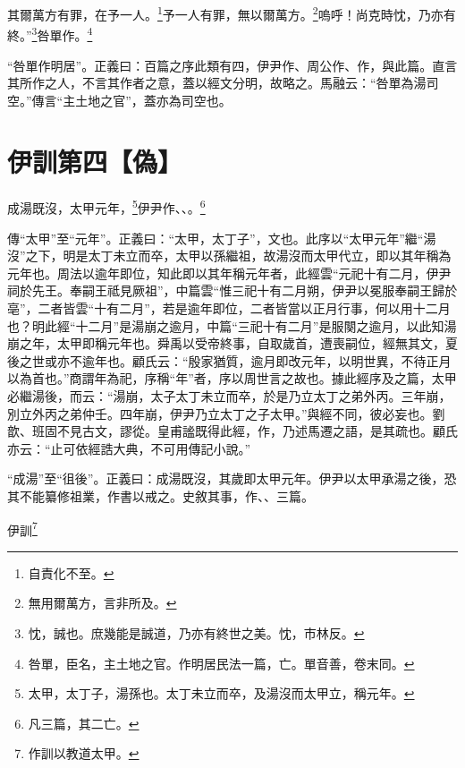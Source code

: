 其爾萬方有罪，在予一人。\footnote{自責化不至。}予一人有罪，無以爾萬方。\footnote{無用爾萬方，言非所及。}嗚呼！尚克時忱，乃亦有終。”\footnote{忱，誠也。庶幾能是誠道，乃亦有終世之美。忱，市林反。}咎單作。\footnote{咎單，臣名，主土地之官。作明居民法一篇，亡。單音善，卷末同。}

{\noindent\shu{}\fzkt “咎單作明居”。正義曰：百篇之序此類有四，伊尹作、周公作、作，與此篇。直言其所作之人，不言其作者之意，蓋以經文分明，故略之。馬融云：“咎單為湯司空。”傳言“主土地之官”，蓋亦為司空也。 \par}

\section{伊訓第四【偽】}


成湯既沒，太甲元年，\footnote{太甲，太丁子，湯孫也。太丁未立而卒，及湯沒而太甲立，稱元年。}伊尹作、、。\footnote{凡三篇，其二亡。}


{\noindent\zhuan{}\fzbyks 傳“太甲”至“元年”。正義曰：“太甲，太丁子”，文也。此序以“太甲元年”繼“湯沒”之下，明是太丁未立而卒，太甲以孫繼祖，故湯沒而太甲代立，即以其年稱為元年也。周法以逾年即位，知此即以其年稱元年者，此經雲“元祀十有二月，伊尹祠於先王。奉嗣王祗見厥祖”，中篇雲“惟三祀十有二月朔，伊尹以冕服奉嗣王歸於亳”，二者皆雲“十有二月”，若是逾年即位，二者皆當以正月行事，何以用十二月也？明此經“十二月”是湯崩之逾月，中篇“三祀十有二月”是服闋之逾月，以此知湯崩之年，太甲即稱元年也。舜禹以受帝終事，自取歲首，遭喪嗣位，經無其文，夏後之世或亦不逾年也。顧氏云：“殷家猶質，逾月即改元年，以明世異，不待正月以為首也。”商謂年為祀，序稱“年”者，序以周世言之故也。據此經序及之篇，太甲必繼湯後，而云：“湯崩，太子太丁未立而卒，於是乃立太丁之弟外丙。三年崩，別立外丙之弟仲壬。四年崩，伊尹乃立太丁之子太甲。”與經不同，彼必妄也。劉歆、班固不見古文，謬從。皇甫謐既得此經，作，乃述馬遷之語，是其疏也。顧氏亦云：“止可依經誥大典，不可用傳記小說。” \par}

{\noindent\shu{}\fzkt “成湯”至“徂後”。正義曰：成湯既沒，其歲即太甲元年。伊尹以太甲承湯之後，恐其不能纂修祖業，作書以戒之。史敘其事，作、、三篇。 \par}

伊訓\footnote{作訓以教道太甲。}

